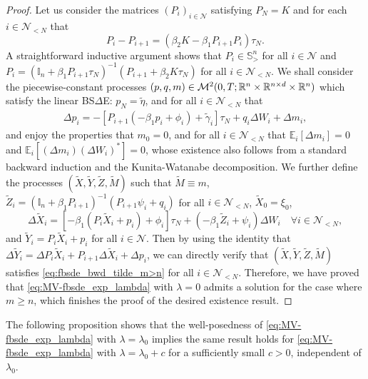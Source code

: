 \documentclass[11pt]{article}
\numberwithin{equation}{section}
\theoremstyle{definition}
\theoremstyle{remark}
\newcommand{\q}{\quad}   \newcommand{\qq}{\qquad}
\def\l{\label}  \def\f{\frac}  \def\fa{\forall}
\def\b{\beta}  \def\a{\alpha} \def\ga{\gamma}
\def\cM{\mathcal{M}}
\def\cN{\mathcal{N}}
\def\sE{{\mathbb{E}}}
\def\sI{{\mathbb{I}}}
\def\sR{{\mathbb R}}
\def\sS{{\mathbb{S}}}
\def\bb{\begin{equation}} \def\ee{\end{equation}}
\begin{document}
\begin{proof}
Let us consider the matrices $(P_i)_{i\in \cN}$ satisfying
$P_N=K$ and
 for each $i\in \cN_{<N}$ that
\bb\l{eq:riccati_n<m}
{P_i-P_{i+1}}=(\b_2 K-\b_1 P_{i+1}P_{i}){\tau_N}.
\ee
A straightforward inductive argument shows 
that $P_i\in \sS^n_>$ for all $i\in \cN$  and 
$P_i=(\sI_n+\b_1P_{i+1}\tau_N)^{-1}(P_{i+1}+\b_2K\tau_N)$
for all $i\in \cN_{<N}$.
We shall consider the piecewise-constant processes
$(p,q,m)\in \cM^2(0,T;\sR^n\t \sR^{n\t d}\t \sR^n)$   which satisfy the
linear BS$\Delta$E:
$p_N=\tilde{\eta}$, and for all  $i\in \cN_{<N}$ that
\begin{align}\l{eq:dp_n<m}
\Delta p_i=-[P_{i+1}(-\b_1p_{i}+{\phi}_{i})+\tilde{\gamma}_i]\tau_N
+q_i\Delta W_i+\Delta m_i,
\end{align}
and
enjoy the properties that 
 $m_0=0$, 
and for all $i\in \cN_{<N}$ that
$\sE_{i}[\Delta m_i] =0$ and  $\sE_{i}[(\Delta m_i)(\Delta W_i)^*] =0$,
whose existence 
also follows from a standard  backward induction and the Kunita-Watanabe decomposition. %
We further define the processes $(\tilde{X},\tilde{Y},\tilde{Z},\tilde{M})$ such that 
$\tilde{M}\equiv m$, 
{$\tilde{Z}_i=(\sI_n+\b_1P_{i+1})^{-1}(P_{i+1}\psi_i+q_i)$}
for all $i\in\cN_{<N}$,
$\tilde{X}_0={\xi}_0$,
$$
\Delta \tilde{X}_i=[-\b_1(P_{i}\tilde{X}_{i}+p_{i})+{\phi}_{i}]\tau_N
+(-\b_1\tilde{Z}_i+{\psi}_i)\Delta W_i
\q \fa i\in \cN_{<N},
$$
and $\tilde{Y}_i=P_i\tilde{X}_i+p_i$ for all $i\in \cN$.
Then by using the identity that 
$\Delta \tilde{Y}_i=\Delta P_i\tilde{X}_{i}+ P_{i+1}\Delta \tilde{X}_i+\Delta p_i$,
we can directly verify that $(\tilde{X},\tilde{Y},\tilde{Z},\tilde{M})$ satisfies \eqref{eq:fbsde_bwd_tilde_m>n}
for all $i\in \cN_{<N}$. 
Therefore, we have proved  that \eqref{eq:MV-fbsde_exp_lambda} with $\lambda=0$ admits a solution for the case where $m\ge n$,
which finishes the proof of the desired existence result.
\end{proof}



The following proposition shows that the well-posedness of 
\eqref{eq:MV-fbsde_exp_lambda} with $\lambda=\lambda_0$
implies the same result
holds for \eqref{eq:MV-fbsde_exp_lambda} with $\lambda=\lambda_0+c$
for a sufficiently small $c>0$, independent of $\lambda_0$.
\end{document}
